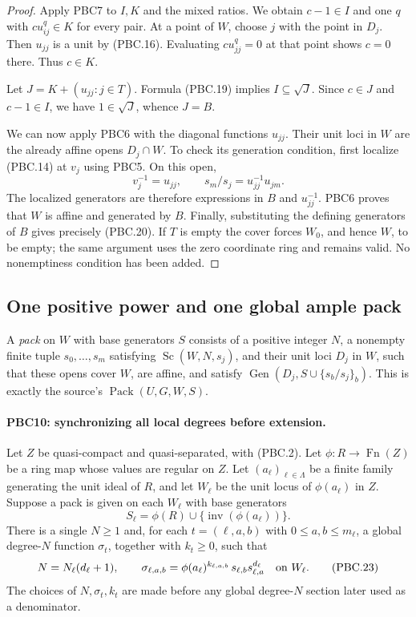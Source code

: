 \begin{proof}
Apply PBC7 to $I,K$ and the mixed ratios.  We obtain
$c-1\in I$ and one $q$ with $c u_{ij}^q\in K$ for every pair.
At a point of $W$, choose $j$ with the point in $D_j$.
Then $u_{jj}$ is a unit by (PBC.16).  Evaluating
$c u_{jj}^q=0$ at that point shows $c=0$ there.
Thus $c\in K$.

Let $J=K+(u_{jj}:j\in T)$.  Formula (PBC.19) implies
$I\subseteq\sqrt J$.  Since $c\in J$ and $c-1\in I$,
we have $1\in\sqrt J$, whence $J=B$.

We can now apply PBC6 with the diagonal functions $u_{jj}$.
Their unit loci in $W$ are the already affine opens
$D_j\cap W$.  To check its generation condition, first localize
(PBC.14) at $v_j$ using PBC5.  On this open,
\[
 v_j^{-1}=u_{jj},\qquad
 s_m/s_j=u_{jj}^{-1}u_{jm}.
                                                        \tag{PBC.21}
\]
The localized generators are therefore expressions in $B$ and
$u_{jj}^{-1}$.  PBC6 proves that $W$ is affine and generated
by $B$.  Finally, substituting the defining generators of $B$
gives precisely (PBC.20).
If $T$ is empty the cover forces $W_0$, and hence $W$, to be
empty; the same argument uses the zero coordinate ring and remains
valid.  No nonemptiness condition has been added.
\end{proof}

\subsection{One positive power and one global ample pack}

A \emph{pack} on $W$ with base generators $S$ consists of a positive
integer $N$, a nonempty finite tuple $s_0,\ldots,s_m$ satisfying
$\operatorname{Sc}(W,N,s_j)$, and their unit loci $D_j$ in $W$,
such that these opens cover $W$, are affine, and satisfy
$\operatorname{Gen}(D_j,S\cup\{s_b/s_j\}_b)$.
This is exactly the source's $\operatorname{Pack}(U,G,W,S)$.

\paragraph{PBC10: synchronizing all local degrees before extension.}
\label{claim:PBC10}
Let $Z$ be quasi-compact and quasi-separated, with (PBC.2).
Let $\phi:R\to\operatorname{Fn}(Z)$ be a ring map whose values
are regular on $Z$.  Let $(a_\ell)_{\ell\in\Lambda}$ be a finite
family generating the unit ideal of $R$, and let $W_\ell$ be
the unit locus of $\phi(a_\ell)$ in $Z$.
Suppose a pack is given on each $W_\ell$ with base generators
\[
 S_\ell=\phi(R)\cup\{\operatorname{inv}(\phi(a_\ell))\}.
                                                        \tag{PBC.22}
\]
There is a single $N\ge1$ and, for each
$t=(\ell,a,b)$ with $0\le a,b\le m_\ell$, a global
degree-$N$ function $\sigma_t$, together with $k_t\ge0$, such that
\[
 N=N_\ell(d_\ell+1),\qquad
 \sigma_{\ell,a,b}
    =\phi(a_\ell)^{k_{\ell,a,b}}\,
       s_{\ell,b}s_{\ell,a}^{d_\ell}
       \quad\hbox{on }W_\ell .
                                                        \tag{PBC.23}
\]
The choices of $N,\sigma_t,k_t$ are made before any global
degree-$N$ section later used as a denominator.


